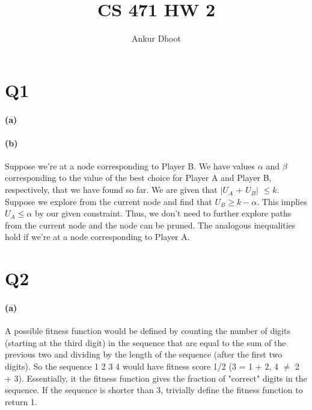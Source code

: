 \documentclass[11pt,a4paper]{article}
\begin{document}
\author{Ankur Dhoot}
\title{CS 471 HW 2}
\maketitle


\section*{Q1}

\paragraph*{(a)}
\begin{center}
\end{center}

\paragraph*{(b)}
Suppose we're at a node corresponding to Player B. We have values $\alpha$ and $\beta$ corresponding to the value of the best choice for Player A and Player B, respectively, that we have found so far. We are given that $|U_{A}$ + $U_{B}|$ $\leq k$. Suppose we explore from the current node and find that $U_{B} \geq k - \alpha$. This implies $U_{A} \leq \alpha$ by our given constraint. Thus, we don't need to further explore paths from the current node and the node can be pruned. The analogous inequalities hold if we're at a node corresponding to Player A.

\section*{Q2}
\paragraph*{(a)}
A possible fitness function would be defined by counting the number of digits (starting at the third digit) in the sequence that are equal to the sum of the previous two and dividing by the length of the sequence (after the first two digits). So the sequence 1 2 3 4 would have fitness score 1/2 (3 = 1 + 2, 4 $\neq$ 2 + 3). Essentially, it the fitness function gives the fraction of "correct" digits in the sequence. If the sequence is shorter than 3, trivially define the fitness function to return 1.
\end{document}
